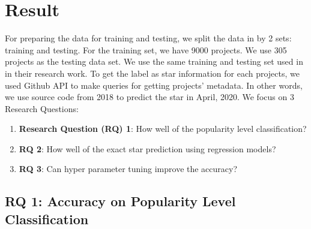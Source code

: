 \section{Result}
For preparing the data for training and testing, we split the data in \cite{013} by 2 sets: training and testing. For the training set, we have 9000 projects. We use 305 projects as the testing data set. We use the same training and testing set used in \cite{013} in their research work. To get the label as star information for each projects, we used Github API to make queries for getting projects' metadata. In other words, we use source code from 2018 to predict the star in April, 2020.  We focus on 3 Research Questions:
\begin{enumerate}
    \item \textbf{Research Question (RQ) 1}: How well of the popularity level classification?
     \item \textbf{RQ 2}: How well of the exact star prediction using regression models?
      \item \textbf{RQ 3}: Can hyper parameter tuning improve the accuracy?
\end{enumerate}



\subsection{RQ 1: Accuracy on Popularity Level Classification}

